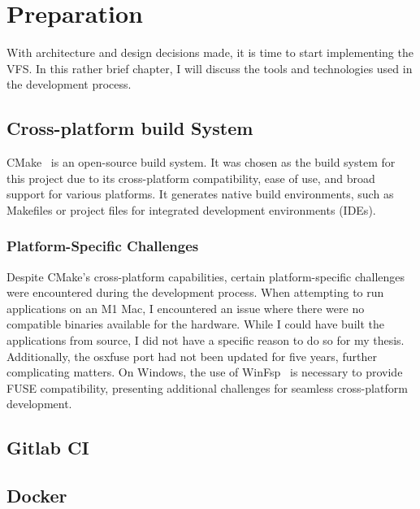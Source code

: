 \chapter{Preparation}
\label{chap:preparation}

With architecture and design decisions made, it is time to start implementing the VFS\@.
In this rather brief chapter, I will discuss the tools and technologies used in the development process.


\section{Cross-platform build System}\label{sec:build-system-and-cross-platform-challenges}

CMake~\cite{cmake} is an open-source build system.
It was chosen as the build system for this project due to its cross-platform compatibility, ease of use, and broad support for various platforms.
It generates native build environments, such as Makefiles or project files for integrated development environments (IDEs).

\subsection{Platform-Specific Challenges}\label{subsec:platform-specific-challenges}

Despite CMake's cross-platform capabilities, certain platform-specific challenges were encountered during the development process.
When attempting to run applications on an M1 Mac, I encountered an issue where there were no compatible binaries available for the hardware.
While I could have built the applications from source, I did not have a specific reason to do so for my thesis.
Additionally, the osxfuse port had not been updated for five years, further complicating matters.
On Windows, the use of WinFsp~\cite{winfsp} is necessary to provide FUSE compatibility, presenting additional challenges for seamless cross-platform development.

\section{Gitlab CI}\label{sec:gitlab-ci}


\section{Docker}\label{sec:docker}

